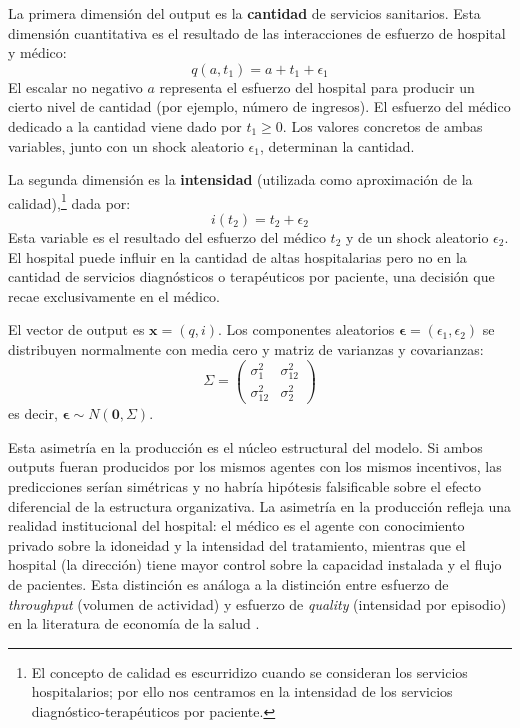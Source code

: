 La primera dimensión del output es la \textbf{cantidad} de servicios sanitarios. Esta dimensión cuantitativa es el resultado de las interacciones de esfuerzo de hospital y médico:
\begin{equation}
  q(a,t_1)=a+t_1+\epsilon_1
  \label{eq:q}
\end{equation}
El escalar no negativo $a$ representa el esfuerzo del hospital para producir un cierto nivel de cantidad (por ejemplo, número de ingresos). El esfuerzo del médico dedicado a la cantidad viene dado por $t_1 \geq 0$. Los valores concretos de ambas variables, junto con un shock aleatorio $\epsilon_1$, determinan la cantidad.

La segunda dimensión es la \textbf{intensidad} (utilizada como aproximación de la calidad),\footnote{El concepto de calidad es escurridizo cuando se consideran los servicios hospitalarios; por ello nos centramos en la intensidad de los servicios diagnóstico-terapéuticos por paciente.} dada por:
\begin{equation}
  i(t_2)=t_2+\epsilon_2
  \label{eq:i}
\end{equation}
Esta variable es el resultado del esfuerzo del médico $t_2$ y de un shock aleatorio $\epsilon_2$. El hospital puede influir en la cantidad de altas hospitalarias pero no en la cantidad de servicios diagnósticos o terapéuticos por paciente, una decisión que recae exclusivamente en el médico.

El vector de output es $\bm{x}=(q,i)$. Los componentes aleatorios $\bm{\epsilon}=(\epsilon_1, \epsilon_2)$ se distribuyen normalmente con media cero y matriz de varianzas y covarianzas:
\begin{equation}
  \Sigma=\begin{pmatrix}
    \sigma^2_1 & \sigma^2_{12} \\
    \sigma^2_{12} & \sigma^2_2
  \end{pmatrix}
  \label{eq:sigma}
\end{equation}
es decir, $\bm{\epsilon}\sim N(\mathbf{0},\Sigma)$.

\begin{remark}
Esta asimetría en la producción es el núcleo estructural del modelo. Si ambos outputs fueran producidos por los mismos agentes con los mismos incentivos, las predicciones serían simétricas y no habría hipótesis falsificable sobre el efecto diferencial de la estructura organizativa. La asimetría en la producción refleja una realidad institucional del hospital: el médico es el agente con conocimiento privado sobre la idoneidad y la intensidad del tratamiento, mientras que el hospital (la dirección) tiene mayor control sobre la capacidad instalada y el flujo de pacientes. Esta distinción es análoga a la distinción entre esfuerzo de \textit{throughput} (volumen de actividad) y esfuerzo de \textit{quality} (intensidad por episodio) en la literatura de economía de la salud \citep{eggleston2005,kaarboe2011}.
\end{remark}

